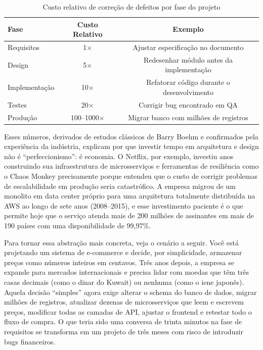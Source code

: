 \begin{table}[h]
\centering
\caption{Custo relativo de correção de defeitos por fase do projeto}
\begin{tabular}{lcc}
\toprule
\textbf{Fase} & \textbf{Custo Relativo} & \textbf{Exemplo} \\
\midrule
Requisitos & 1$\times$ & Ajustar especificação no documento \\
Design & 5$\times$ & Redesenhar módulo antes da implementação \\
Implementação & 10$\times$ & Refatorar código durante o desenvolvimento \\
Testes & 20$\times$ & Corrigir bug encontrado em QA \\
Produção & 100--1000$\times$ & Migrar banco com milhões de registros \\
\bottomrule
\end{tabular}
\label{tab:custo-mudanca}
\end{table}

Esses números, derivados de estudos clássicos de Barry Boehm e confirmados
pela experiência da indústria, explicam por que investir tempo em arquitetura
e design não é ``perfeccionismo'': é economia. O Netflix, por exemplo,
investiu anos construindo sua infraestrutura de microsserviços e ferramentas
de resiliência como o Chaos Monkey precisamente porque entendeu que o custo
de corrigir problemas de escalabilidade em produção seria catastrófico. A
empresa migrou de um monolito em data center próprio para uma arquitetura
totalmente distribuída na AWS ao longo de sete anos (2008--2015), e esse
investimento paciente é o que permite hoje que o serviço atenda mais de 200
milhões de assinantes em mais de 190 países com uma disponibilidade de
99,97\%.

Para tornar essa abstração mais concreta, veja o cenário a seguir.
Você está projetando um sistema de e-commerce e decide, por simplicidade,
armazenar preços como números inteiros em centavos. Três anos depois, a
empresa se expande para mercados internacionais e precisa lidar com moedas
que têm três casas decimais (como o dinar do Kuwait) ou nenhuma (como o
iene japonês). Aquela decisão ``simples'' agora exige alterar o schema do
banco de dados, migrar milhões de registros, atualizar dezenas de
microsserviços que leem e escrevem preços, modificar todas as camadas de
API, ajustar o frontend e retestar todo o fluxo de compra. O que teria
sido uma conversa de trinta minutos na fase de requisitos se transforma
em um projeto de três meses com risco de introduzir bugs financeiros.

